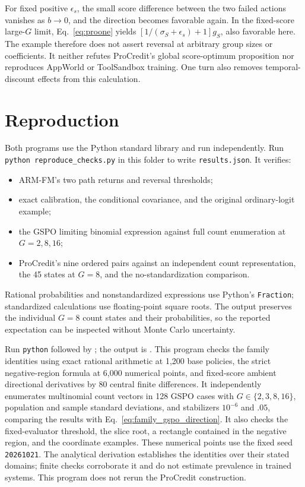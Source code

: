 \documentclass[11pt]{article}
\begin{document}
For fixed positive $\epsilon_s$, the small score difference between the two failed actions vanishes as $b\to0$, and the direction becomes favorable again. In the fixed-score large-$G$ limit, Eq.~\eqref{eq:proone} yields
$[1/(\sigma_S+\epsilon_s)+1]g_S$, also favorable here. The example therefore does not assert reversal at arbitrary group sizes or coefficients. It neither refutes ProCredit's global score-optimum proposition nor reproduces AppWorld or ToolSandbox training. One turn also removes temporal-discount effects from this calculation.

\section{Reproduction}
Both programs use the Python standard library and run independently.
Run \texttt{python reproduce\_checks.py} in this folder to write \texttt{results.json}. It verifies:
\begin{itemize}
\item ARM-FM's two path returns and reversal thresholds;
\item exact calibration, the conditional covariance, and the original ordinary-logit example;
\item the GSPO limiting binomial expression against full count enumeration at $G=2,8,16$;
\item ProCredit's nine ordered pairs against an independent count representation, the 45 states at $G=8$, and the no-standardization comparison.
\end{itemize}
Rational probabilities and nonstandardized expressions use Python's \texttt{Fraction}; standardized calculations use floating-point square roots. The output preserves the individual $G=8$ count states and their probabilities, so the reported expectation can be inspected without Monte Carlo uncertainty.

Run \texttt{python} followed by ;
the output is . This program checks the family identities using exact rational arithmetic at 1,200 base policies, the strict negative-region formula at 6,000 numerical points, and fixed-score ambient directional derivatives by 80 central finite differences. It independently enumerates multinomial count vectors in 128 GSPO cases with $G\in\{2,3,8,16\}$, population and sample standard deviations, and stabilizers $10^{-6}$ and $.05$, comparing the results with Eq.~\eqref{eq:family_gspo_direction}. It also checks the fixed-evaluator threshold, the slice root, a rectangle contained in the negative region, and the coordinate examples. These numerical points use the fixed seed \texttt{20261021}. The analytical derivation establishes the identities over their stated domains; finite checks corroborate it and do not estimate prevalence in trained systems. This program does not rerun the ProCredit construction.


\begingroup
\raggedright

\endgroup
\end{document}

